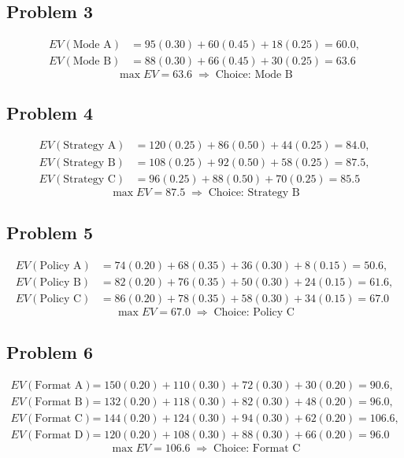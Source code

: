 	\subsection*{Problem 3}
	\[
	\begin{aligned}
	EV(\text{Mode A}) &= 95(0.30)+60(0.45)+18(0.25)=60.0,\\
	EV(\text{Mode B}) &= 88(0.30)+66(0.45)+30(0.25)=63.6
	\end{aligned}
	\]
	\[
	\max EV = 63.6 \;\Rightarrow\; \text{Choice: Mode B}
	\]

	\subsection*{Problem 4}
	\[
	\begin{aligned}
	EV(\text{Strategy A}) &= 120(0.25)+86(0.50)+44(0.25)=84.0,\\
	EV(\text{Strategy B}) &= 108(0.25)+92(0.50)+58(0.25)=87.5,\\
	EV(\text{Strategy C}) &= 96(0.25)+88(0.50)+70(0.25)=85.5
	\end{aligned}
	\]
	\[
	\max EV = 87.5 \;\Rightarrow\; \text{Choice: Strategy B}
	\]

	\subsection*{Problem 5}
	\[
	\begin{aligned}
	EV(\text{Policy A}) &= 74(0.20)+68(0.35)+36(0.30)+8(0.15)=50.6,\\
	EV(\text{Policy B}) &= 82(0.20)+76(0.35)+50(0.30)+24(0.15)=61.6,\\
	EV(\text{Policy C}) &= 86(0.20)+78(0.35)+58(0.30)+34(0.15)=67.0
	\end{aligned}
	\]
	\[
	\max EV = 67.0 \;\Rightarrow\; \text{Choice: Policy C}
	\]

	\subsection*{Problem 6}
	\[
	\begin{aligned}
	EV(\text{Format A}) &= 150(0.20)+110(0.30)+72(0.30)+30(0.20)=90.6,\\
	EV(\text{Format B}) &= 132(0.20)+118(0.30)+82(0.30)+48(0.20)=96.0,\\
	EV(\text{Format C}) &= 144(0.20)+124(0.30)+94(0.30)+62(0.20)=106.6,\\
	EV(\text{Format D}) &= 120(0.20)+108(0.30)+88(0.30)+66(0.20)=96.0
	\end{aligned}
	\]
	\[
	\max EV = 106.6 \;\Rightarrow\; \text{Choice: Format C}
	\]

